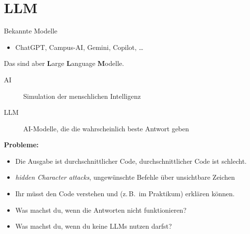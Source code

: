 \section{LLM}


\begin{frame}{Bekannte Modelle}
    \begin{itemize}
        \item ChatGPT, Campus-AI, Gemini, Copilot, \dots
    \end{itemize}
    Das sind aber \textbf{L}arge \textbf{L}anguage \textbf{M}odelle.
    \begin{description}
        \item[AI] Simulation der menschlichen Intelligenz
        \item[LLM] AI-Modelle, die die wahrscheinlich beste Antwort geben
    \end{description}

    \textcolor{vertexDarkRed}{\textbf{Probleme:}}
    \begin{itemize}
        \item Die Ausgabe ist durchschnittlicher Code, durchschnittlicher Code ist schlecht.
        \item \textit{hidden Character attacks}, ungewünschte Befehle über unsichtbare Zeichen
        \item Ihr müsst den Code verstehen und (z.\,B.\ im Praktikum) erklären können.
        \item Was machst du, wenn die Antworten nicht funktionieren?
        \item Was machst du, wenn du keine LLMs nutzen darfst?
    \end{itemize}
\end{frame}